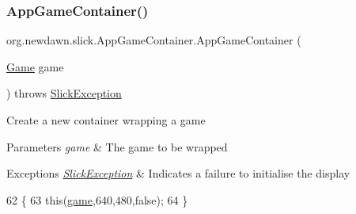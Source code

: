 \subsubsection{\texorpdfstring{App\+Game\+Container()}{AppGameContainer()}\hspace{0.1cm}{\footnotesize\ttfamily [1/2]}}
{\footnotesize\ttfamily org.\+newdawn.\+slick.\+App\+Game\+Container.\+App\+Game\+Container (\begin{DoxyParamCaption}\item[{\mbox{\hyperlink{interfaceorg_1_1newdawn_1_1slick_1_1_game}{Game}}}]{game }\end{DoxyParamCaption}) throws \mbox{\hyperlink{classorg_1_1newdawn_1_1slick_1_1_slick_exception}{Slick\+Exception}}\hspace{0.3cm}{\ttfamily [inline]}}

Create a new container wrapping a game


\begin{DoxyParams}{Parameters}
{\em game} & The game to be wrapped \\
\hline
\end{DoxyParams}

\begin{DoxyExceptions}{Exceptions}
{\em \mbox{\hyperlink{classorg_1_1newdawn_1_1slick_1_1_slick_exception}{Slick\+Exception}}} & Indicates a failure to initialise the display \\
\hline
\end{DoxyExceptions}

\begin{DoxyCode}
62                                                              \{
63         \textcolor{keyword}{this}(\mbox{\hyperlink{classorg_1_1newdawn_1_1slick_1_1_game_container_a6a38bb26e45e1c884940caf35c7cfcdc}{game}},640,480,\textcolor{keyword}{false});
64     \}
\end{DoxyCode}
\mbox{\label{classorg_1_1newdawn_1_1slick_1_1_app_game_container_a7fd49f1d10b90d8c30368f9c31eb8116}} 
